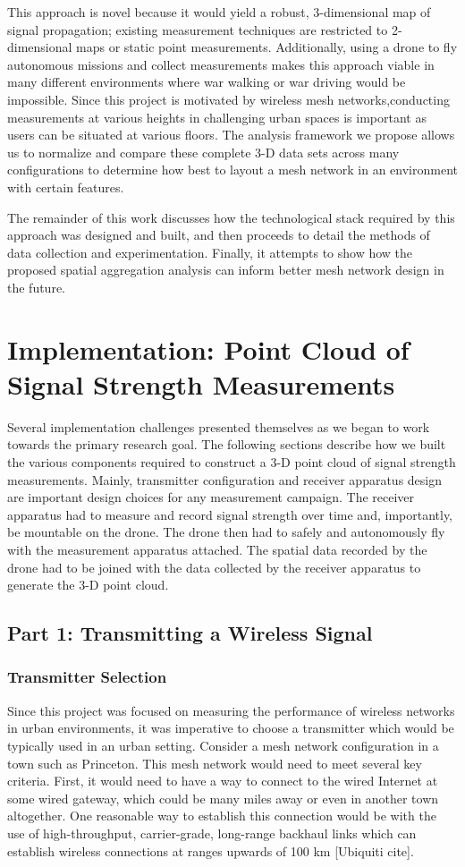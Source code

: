\documentclass[pageno]{jpaper}
\begin{document}
This approach is novel because it would yield a robust, 3-dimensional map of signal propagation; existing measurement techniques are restricted to 2-dimensional maps or static point measurements. Additionally, using a drone to fly autonomous missions and collect measurements makes this approach viable in many different environments where war walking or war driving would be impossible. Since this project is motivated by wireless mesh networks,conducting measurements at various heights in challenging urban spaces is important as users can be situated at various floors. 
The analysis framework we propose allows us to normalize and compare these complete 3-D data sets across many configurations to determine how best to layout a mesh network in an environment with certain features.

The remainder of this work discusses how the technological stack required by this approach was designed and built, and then proceeds to detail the methods of data collection and experimentation. Finally, it attempts to show how the proposed spatial aggregation analysis can inform better mesh network design in the future.

\section{Implementation: Point Cloud of Signal Strength Measurements}
Several implementation challenges presented themselves as we began to work towards the primary research goal. The following sections describe how we built the various components required to construct a 3-D point cloud of signal strength measurements. Mainly, transmitter configuration and receiver apparatus design are  important design choices for any measurement campaign. The receiver apparatus had to measure and record signal strength over time and, importantly, be mountable on the drone. The drone then had to safely and autonomously fly with the measurement apparatus attached. The spatial data recorded by the drone had to be joined with the data collected by the receiver apparatus to generate the 3-D point cloud.

\subsection{Part 1: Transmitting a Wireless Signal}

\subsubsection{Transmitter Selection}
Since this project was focused on measuring the performance of wireless networks in urban environments, it was imperative to choose a transmitter which would be typically used in an urban setting. Consider a mesh network configuration in a town such as Princeton. This mesh network would need to meet several key criteria. First, it would need to have a way to connect to the wired Internet at some wired gateway, which could be many miles away or even in another town altogether. One reasonable way to establish this connection would be with the use of high-throughput, carrier-grade, long-range backhaul links which can establish wireless connections at ranges upwards of 100 km [Ubiquiti cite].
\end{document}
